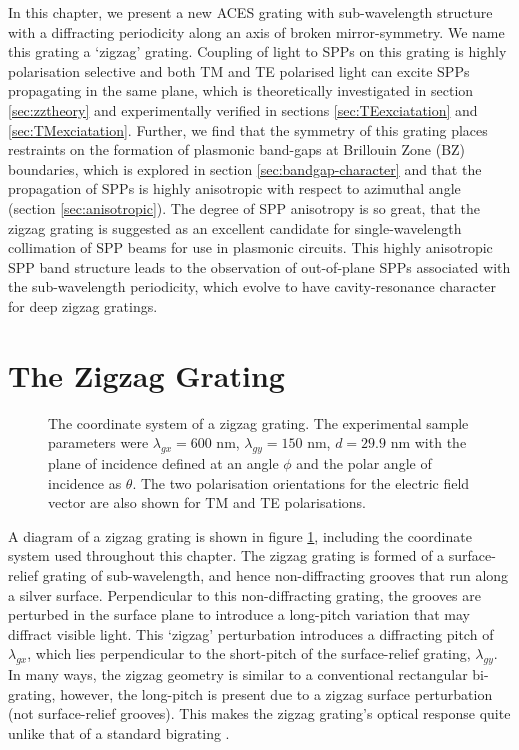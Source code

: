 In this chapter, we present a new ACES grating with sub-wavelength structure with a diffracting periodicity along an axis of broken mirror-symmetry. We name this grating a `zigzag' grating.  Coupling of light to SPPs on this grating is highly polarisation selective and both TM and TE polarised light can excite SPPs propagating in the same plane, which is theoretically investigated in section \ref{sec:zztheory} and experimentally verified in sections \ref{sec:TEexciatation} and \ref{sec:TMexciatation}. Further, we find that the symmetry of this grating places restraints on the formation of plasmonic band-gaps at Brillouin Zone (BZ) boundaries, which is explored in section \ref{sec:bandgap-character} and that the propagation of SPPs is highly anisotropic with respect to azimuthal angle (section \ref{sec:anisotropic}). The degree of SPP anisotropy is so great, that the zigzag grating is suggested as an excellent candidate for single-wavelength collimation of SPP beams for use in plasmonic circuits. This highly anisotropic SPP band structure leads to the observation of out-of-plane SPPs associated with the sub-wavelength periodicity, which evolve to have cavity-resonance character for deep zigzag gratings.

\section{The Zigzag Grating}

\begin{figure}
\begin{center}

\end{center}
\caption[The coordinate system of a zigzag grating.]{The coordinate system of a zigzag grating. The experimental sample parameters were $\lambda_{gx} = 600$ nm, $\lambda_{gy} = 150$ nm, $d = 29.9$ nm with the plane of incidence defined at an angle  $\phi$ and the polar angle of incidence as $\theta$. The two polarisation orientations for the electric field vector are also shown for TM and TE polarisations. \label{fig:zz-coorinatesystem}}
\end{figure}

A diagram of a zigzag grating is shown in figure \ref{fig:zz-coorinatesystem}, including the coordinate system used throughout this chapter. The zigzag grating is formed of a surface-relief grating of sub-wavelength, and hence non-diffracting grooves that run along a silver surface. Perpendicular to this non-diffracting grating, the grooves are perturbed in the surface plane to introduce a long-pitch variation that may diffract visible light. This ‘zigzag’ perturbation introduces a diffracting pitch of $\lambda_{gx}$, which lies perpendicular to the short-pitch of the surface-relief grating, $\lambda_{gy}$. In many ways, the zigzag geometry is similar to a conventional rectangular bi-grating, however, the long-pitch is present due to a zigzag surface perturbation (not surface-relief grooves). This makes the zigzag grating's optical response quite unlike that of a standard bigrating .

